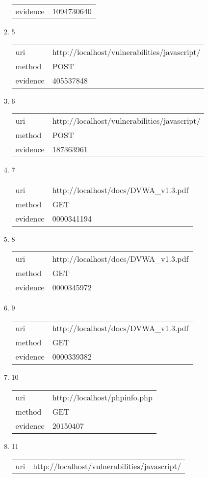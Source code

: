 \documentclass[10pt]{article}
\begin{document}
\begin{itemize}
\begin{enumerate}
\begin{tabular}{| l | p{12cm}}
evidence & 1094730640 \\
\end{tabular}
\item[] 5
\begin{tabular}{| l | p{12cm}}
uri & http://localhost/vulnerabilities/javascript/ \\
method & POST \\
evidence & 405537848 \\
\end{tabular}
\item[] 6
\begin{tabular}{| l | p{12cm}}
uri & http://localhost/vulnerabilities/javascript/ \\
method & POST \\
evidence & 187363961 \\
\end{tabular}
\item[] 7
\begin{tabular}{| l | p{12cm}}
uri & http://localhost/docs/DVWA\_v1.3.pdf \\
method & GET \\
evidence & 0000341194 \\
\end{tabular}
\item[] 8
\begin{tabular}{| l | p{12cm}}
uri & http://localhost/docs/DVWA\_v1.3.pdf \\
method & GET \\
evidence & 0000345972 \\
\end{tabular}
\item[] 9
\begin{tabular}{| l | p{12cm}}
uri & http://localhost/docs/DVWA\_v1.3.pdf \\
method & GET \\
evidence & 0000339382 \\
\end{tabular}
\item[] 10
\begin{tabular}{| l | p{12cm}}
uri & http://localhost/phpinfo.php \\
method & GET \\
evidence & 20150407 \\
\end{tabular}
\item[] 11
\begin{tabular}{| l | p{12cm}}
uri & http://localhost/vulnerabilities/javascript/ \\

\end{tabular}
\end{enumerate}
\end{itemize}
\end{document}
